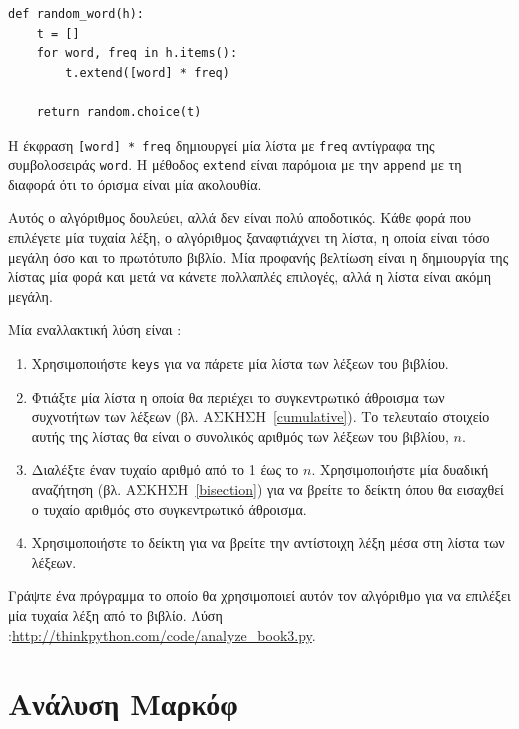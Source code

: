 \documentclass[10pt]{book}
\begin{document}
\begin{verbatim}
def random_word(h):
    t = []
    for word, freq in h.items():
        t.extend([word] * freq)

    return random.choice(t)
\end{verbatim}
%
 Η έκφραση  {\tt [word] * freq}  δημιουργεί μία λίστα με  {\tt freq}  αντίγραφα της συμβολοσειράς  {\tt word}.  Η μέθοδος  {\tt extend}  είναι παρόμοια με την  {\tt append}  με τη διαφορά ότι το όρισμα είναι μία ακολουθία.

\begin{exercise}
\label{randhist}

Αυτός ο αλγόριθμος δουλεύει, αλλά δεν είναι πολύ αποδοτικός. Κάθε φορά που επιλέγετε μία 
τυχαία λέξη, ο αλγόριθμος ξαναφτιάχνει τη λίστα, η οποία είναι τόσο μεγάλη όσο και το πρωτότυπο βιβλίο. Μία προφανής βελτίωση είναι η δημιουργία της λίστας μία φορά και μετά να κάνετε πολλαπλές επιλογές, αλλά η λίστα είναι ακόμη μεγάλη.

Μία εναλλακτική λύση είναι :

\begin{enumerate}

\item  Χρησιμοποιήστε  {\tt keys}  για να πάρετε μία λίστα των λέξεων του βιβλίου. 

\item  Φτιάξτε μία λίστα η οποία θα περιέχει το συγκεντρωτικό άθροισμα των συχνοτήτων των λέξεων (βλ. ΑΣΚΗΣΗ~\ref{cumulative}). Το τελευταίο στοιχείο αυτής της λίστας θα είναι ο συνολικός αριθμός των λέξεων του βιβλίου,   $n$.

\item  Διαλέξτε έναν τυχαίο αριθμό από το 1 έως το $n$. Χρησιμοποιήστε μία δυαδική αναζήτηση (βλ. ΑΣΚΗΣΗ~\ref{bisection}) για να βρείτε το δείκτη όπου θα εισαχθεί ο τυχαίο αριθμός στο συγκεντρωτικό άθροισμα. 

\item  Χρησιμοποιήστε το δείκτη για να βρείτε την αντίστοιχη λέξη μέσα στη λίστα των λέξεων. 

\end{enumerate}

 Γράψτε ένα πρόγραμμα το οποίο θα χρησιμοποιεί αυτόν τον αλγόριθμο για να επιλέξει μία τυχαία λέξη από το βιβλίο. Λύση :\url{http://thinkpython.com/code/analyze_book3.py}.
\end{exercise}


 
\section{Ανάλυση Μαρκόφ}
\label{markov}
\end{document}
